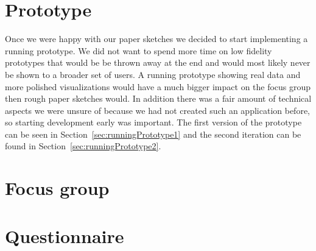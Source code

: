 \section{Prototype}
Once we were happy with our paper sketches we decided to start implementing a running prototype. We did not want to spend more time on low fidelity prototypes that would be be thrown away at the end and would most likely never be shown to a broader set of users. A running prototype showing real data and more polished visualizations would have a much bigger impact on the focus group then rough paper sketches would. In addition there was a fair amount of technical aspects we were unsure of because we had not created such an application before, so starting development early was important. The first version of the prototype can be seen in Section~\ref{sec:runningPrototype1} and the second iteration can be found in Section~\ref{sec:runningPrototype2}.

\section{Focus group}

\section{Questionnaire}

